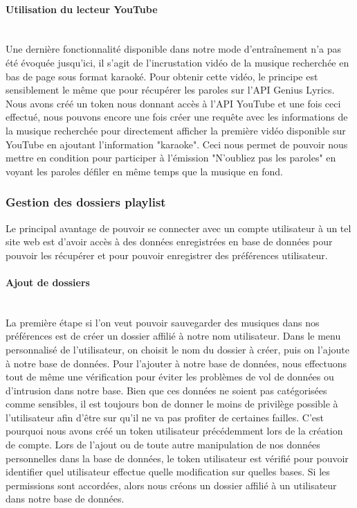 \documentclass[12pt,french]{article}
\begin{document}
\paragraph{Utilisation du lecteur YouTube \\\\}

Une dernière fonctionnalité disponible dans notre mode d'entraînement n'a pas été évoquée jusqu'ici, il s'agit de l'incrustation vidéo de la musique recherchée en bas de page sous format karaoké. Pour obtenir cette vidéo, le principe est sensiblement le même que pour récupérer les paroles sur l'\gls{API} Genius Lyrics. Nous avons créé un \gls{token} nous donnant accès à l'\gls{API} YouTube et une fois ceci effectué, nous pouvons encore une fois créer une requête avec les informations de la musique recherchée pour directement afficher la première vidéo disponible sur YouTube en ajoutant l'information "karaoke". Ceci nous permet de pouvoir nous mettre en condition pour participer à l'émission "N'oubliez pas les paroles" en voyant les paroles défiler en même temps que la musique en fond.  

\subsubsection{Gestion des dossiers playlist}

Le principal avantage de pouvoir se connecter avec un compte utilisateur à un tel site web est d'avoir accès à des données enregistrées en base de données pour pouvoir les récupérer et pour pouvoir enregistrer des préférences utilisateur.

\paragraph{Ajout de dossiers \\\\}

La première étape si l'on veut pouvoir sauvegarder des musiques dans nos préférences est de créer un dossier affilié à notre nom utilisateur. Dans le menu personnalisé de l'utilisateur, on choisit le nom du dossier à créer, puis on l'ajoute à notre base de données. Pour l'ajouter à notre base de données, nous effectuons tout de même une vérification pour éviter les problèmes de vol de données ou d'intrusion dans notre base. Bien que ces données ne soient pas catégorisées comme sensibles, il est toujours bon de donner le moins de privilège possible à l'utilisateur afin d'être sur qu'il ne va pas profiter de certaines failles. C'est pourquoi nous avons créé un \gls{token} utilisateur précédemment lors de la création de compte. Lors de l'ajout ou de toute autre manipulation de nos données personnelles dans la base de données, le \gls{token} utilisateur est vérifié pour pouvoir identifier quel utilisateur effectue quelle modification sur quelles bases. Si les permissions sont accordées, alors nous créons un dossier affilié à un utilisateur dans notre base de données.
\end{document}
